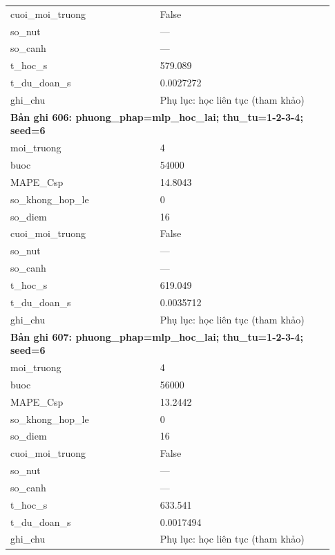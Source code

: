 \begin{longtable}{p{0.43\linewidth}p{0.50\linewidth}}
cuoi\_\allowbreak moi\_\allowbreak truong & False \\
so\_\allowbreak nut & — \\
so\_\allowbreak canh & — \\
t\_\allowbreak hoc\_\allowbreak s & 579.089 \\
t\_\allowbreak du\_\allowbreak doan\_\allowbreak s & 0.0027272 \\
ghi\_\allowbreak chu & Phụ lục: học liên tục (tham khảo) \\
\midrule
\multicolumn{2}{p{0.95\linewidth}}{\textbf{Bản ghi 606: phuong\_phap=mlp\_hoc\_lai; thu\_tu=1-2-3-4; seed=6}} \\
moi\_\allowbreak truong & 4 \\
buoc & 54000 \\
MAPE\_\allowbreak Csp & 14.8043 \\
so\_\allowbreak khong\_\allowbreak hop\_\allowbreak le & 0 \\
so\_\allowbreak diem & 16 \\
cuoi\_\allowbreak moi\_\allowbreak truong & False \\
so\_\allowbreak nut & — \\
so\_\allowbreak canh & — \\
t\_\allowbreak hoc\_\allowbreak s & 619.049 \\
t\_\allowbreak du\_\allowbreak doan\_\allowbreak s & 0.0035712 \\
ghi\_\allowbreak chu & Phụ lục: học liên tục (tham khảo) \\
\midrule
\multicolumn{2}{p{0.95\linewidth}}{\textbf{Bản ghi 607: phuong\_phap=mlp\_hoc\_lai; thu\_tu=1-2-3-4; seed=6}} \\
moi\_\allowbreak truong & 4 \\
buoc & 56000 \\
MAPE\_\allowbreak Csp & 13.2442 \\
so\_\allowbreak khong\_\allowbreak hop\_\allowbreak le & 0 \\
so\_\allowbreak diem & 16 \\
cuoi\_\allowbreak moi\_\allowbreak truong & False \\
so\_\allowbreak nut & — \\
so\_\allowbreak canh & — \\
t\_\allowbreak hoc\_\allowbreak s & 633.541 \\
t\_\allowbreak du\_\allowbreak doan\_\allowbreak s & 0.0017494 \\
ghi\_\allowbreak chu & Phụ lục: học liên tục (tham khảo) \\

\end{longtable}
